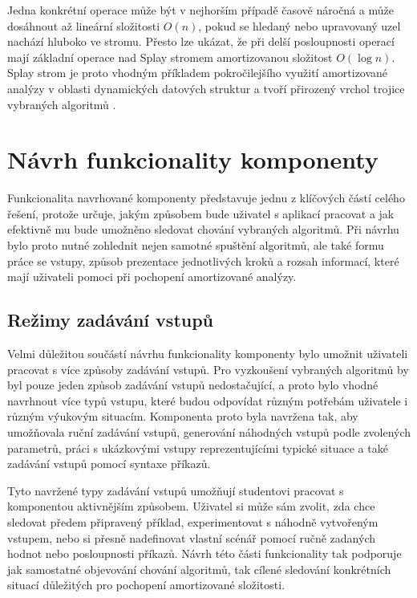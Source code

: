 Jedna konkrétní operace může být v nejhorším případě časově náročná a může dosáhnout až lineární složitosti \(O(n)\), pokud se hledaný nebo upravovaný uzel nachází hluboko ve stromu. Přesto lze ukázat, že při delší posloupnosti operací mají základní operace nad Splay stromem amortizovanou složitost \(O(\log n)\). Splay strom je proto vhodným příkladem pokročilejšího využití amortizované analýzy v oblasti dynamických datových struktur a tvoří přirozený vrchol trojice vybraných algoritmů \cite{sleator_tarjan_splay}.


\section{Návrh funkcionality komponenty}
Funkcionalita navrhované komponenty představuje jednu z klíčových částí celého řešení, protože určuje, jakým způsobem bude uživatel s aplikací pracovat a jak efektivně mu bude umožněno sledovat chování vybraných algoritmů. Při návrhu bylo proto nutné zohlednit nejen samotné spuštění algoritmů, ale také formu práce se vstupy, způsob prezentace jednotlivých kroků a rozsah informací, které mají uživateli pomoci při pochopení amortizované analýzy.
\newpage

\subsection{Režimy zadávání vstupů}
Velmi důležitou součástí návrhu funkcionality komponenty bylo umožnit uživateli pracovat s více způsoby zadávání vstupů. Pro vyzkoušení vybraných algoritmů by byl pouze jeden způsob zadávání vstupů nedostačující, a proto bylo vhodné navrhnout více typů vstupu, které budou odpovídat různým potřebám uživatele i různým výukovým situacím. Komponenta proto byla navržena tak, aby umožňovala ruční zadávání vstupů, generování náhodných vstupů podle zvolených parametrů, práci s ukázkovými vstupy reprezentujícími typické situace a také zadávání vstupů pomocí syntaxe příkazů.

Tyto navržené typy zadávání vstupů umožňují studentovi pracovat s komponentou aktivnějším způsobem. Uživatel si může sám zvolit, zda chce sledovat předem připravený příklad, experimentovat s náhodně vytvořeným vstupem, nebo si přesně nadefinovat vlastní scénář pomocí ručně zadaných hodnot nebo posloupnosti příkazů. Návrh této části funkcionality tak podporuje jak samostatné objevování chování algoritmů, tak cílené sledování konkrétních situací důležitých pro pochopení amortizované složitosti.

